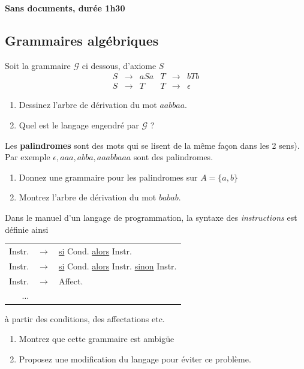 \documentclass[twoside,11pt]{article}
\begin{document}
\maketitle

\textbf{Sans documents, durée 1h30}

\begin{multicols*}{2}
\section{Grammaires algébriques}

\Q Soit la grammaire $\mathcal{G}$ ci dessous, d'axiome $S$ 
$$\begin{array}{|rcl|rcl|}
S & \rightarrow &a S a &
T & \rightarrow & b T b  \\
S & \rightarrow & T & 
T & \rightarrow & \epsilon 
\end{array}
$$
\begin{enumerate}
\item Dessinez l'arbre de dérivation du mot $aabbaa$.
\item Quel est le langage engendré par $\mathcal{G}$ ?
\end{enumerate}

\Q Les \textbf{palindromes} sont des mots qui se lisent
de la même façon dans les 2 sens).  Par exemple
$\epsilon, aaa, abba, aaabbaaa$ sont des palindromes.
\begin{enumerate}
\item Donnez une grammaire pour les palindromes sur
$A = \{a,b\}$
\item Montrez l'arbre de dérivation du mot $babab$.
\end{enumerate}

\Q Dans le manuel d'un langage de programmation, la syntaxe des 
\emph{instructions}  est définie ainsi
\begin{center}
\begin{tabular}{|rcl|}
\hline
Instr. & $\rightarrow$ &\underline{si} Cond.
\underline{alors} Instr. \\  
Instr. & $\rightarrow$ &\underline{si} Cond.
\underline{alors} Instr. 
\underline{sinon} Instr.  \\  
Instr. & $\rightarrow$ & Affect. \\
$\ldots$ &&
\\ \hline

\end{tabular}
\end{center}
à partir des conditions, des affectations etc.
\begin{enumerate}
\item Montrez que cette grammaire est ambigüe
\item Proposez une modification du langage pour éviter ce problème.
\end{enumerate}


\end{multicols*}
\end{document}
